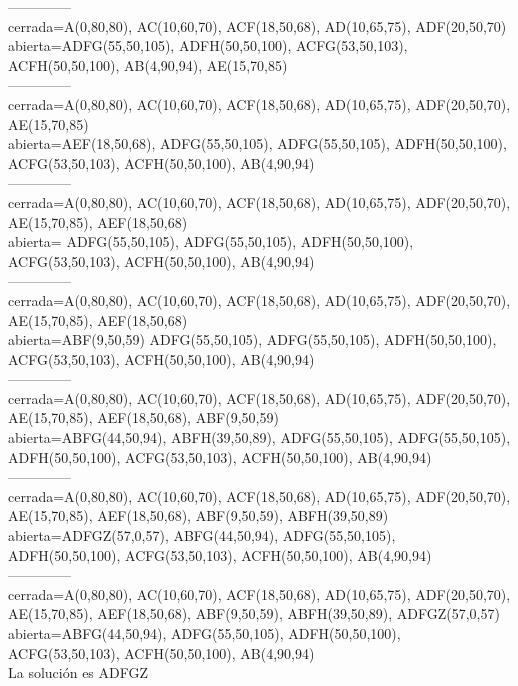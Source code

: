 \documentclass[a4paper,10pt]{article}
\begin{document}
--------------\\
cerrada=A(0,80,80), AC(10,60,70), ACF(18,50,68), AD(10,65,75), ADF(20,50,70)\\
abierta=ADFG(55,50,105), ADFH(50,50,100), ACFG(53,50,103), ACFH(50,50,100), AB(4,90,94), AE(15,70,85)\\
--------------\\
cerrada=A(0,80,80), AC(10,60,70), ACF(18,50,68), AD(10,65,75), ADF(20,50,70), AE(15,70,85)\\
abierta=AEF(18,50,68), ADFG(55,50,105), ADFG(55,50,105), ADFH(50,50,100), ACFG(53,50,103), ACFH(50,50,100), AB(4,90,94)\\
--------------\\
cerrada=A(0,80,80), AC(10,60,70), ACF(18,50,68), AD(10,65,75), ADF(20,50,70), AE(15,70,85), AEF(18,50,68)\\
abierta= ADFG(55,50,105), ADFG(55,50,105), ADFH(50,50,100), ACFG(53,50,103), ACFH(50,50,100), AB(4,90,94)\\
--------------\\
cerrada=A(0,80,80), AC(10,60,70), ACF(18,50,68), AD(10,65,75), ADF(20,50,70), AE(15,70,85), AEF(18,50,68)\\
abierta=ABF(9,50,59) ADFG(55,50,105), ADFG(55,50,105), ADFH(50,50,100), ACFG(53,50,103), ACFH(50,50,100), AB(4,90,94)\\
--------------\\
cerrada=A(0,80,80), AC(10,60,70), ACF(18,50,68), AD(10,65,75), ADF(20,50,70), AE(15,70,85), AEF(18,50,68), ABF(9,50,59)\\
abierta=ABFG(44,50,94), ABFH(39,50,89), ADFG(55,50,105), ADFG(55,50,105), ADFH(50,50,100), ACFG(53,50,103), ACFH(50,50,100), AB(4,90,94)\\
--------------\\
cerrada=A(0,80,80), AC(10,60,70), ACF(18,50,68), AD(10,65,75), ADF(20,50,70), AE(15,70,85), AEF(18,50,68), ABF(9,50,59), ABFH(39,50,89)\\
abierta=ADFGZ(57,0,57), ABFG(44,50,94), ADFG(55,50,105), ADFH(50,50,100), ACFG(53,50,103), ACFH(50,50,100), AB(4,90,94)\\
--------------\\
cerrada=A(0,80,80), AC(10,60,70), ACF(18,50,68), AD(10,65,75), ADF(20,50,70), AE(15,70,85), AEF(18,50,68), ABF(9,50,59), ABFH(39,50,89), ADFGZ(57,0,57)\\
abierta=ABFG(44,50,94), ADFG(55,50,105), ADFH(50,50,100), ACFG(53,50,103), ACFH(50,50,100), AB(4,90,94)\\
\vspace{1cm}
La solución es ADFGZ
\pagebreak
\end{document}
